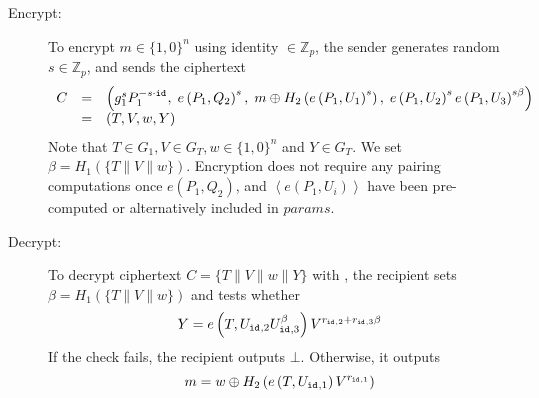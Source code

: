 \begin{algorithm}
\begin{description}
\item[Encrypt:] To encrypt $m \in \{ 1, 0 \}^n$ using identity \id{} $\in \mathbb{Z}_p$, the sender generates random $s \in \mathbb{Z}_p$, and sends the ciphertext
\begin{equation*}
 \begin{array}{lcl}
  C & = & \left( g_{1}^{s}P_1^{-s\cdot\mathtt{id}_{}}, \; e \left( P_1, Q_2\right)^s, \; m \oplus H_2 \left( e \left( P_1, U_1 \right)^s \right), \; e \left( P_1, U_2 \right)^s e \left( P_1, U_3\right)^{s \beta} \right) \\ & = & \left( T, V, w, Y \right)
 \end{array}
\end{equation*}
Note that $T \in G_1, V \in G_T,  w \in \{ 1, 0 \}^n$ and $Y \in G_T$. We set $\beta = H_1 \left( \{ T \parallel V \parallel w \} \right)$. Encryption does not require any pairing computations once $e \left( P_1, Q_2 \right)$, and $\left< e \left( P_1, U_i \right) \right>$ have been pre-computed or alternatively included in $params$.

\item[Decrypt:] To decrypt ciphertext $C = \{ T \parallel V \parallel w \parallel Y \}$ with \id{}, the recipient sets $\beta=H_1 \left( \{ T \parallel V \parallel w \} \right)$ and tests whether
\begin{equation*}
 Y = e \left( T, U_{\mathtt{id}_{}, 2}U_{\mathtt{id}_{}, 3}^{\beta} \right)V^{r_{\mathtt{id}_{},2}+r_{\mathtt{id}_{},3}\beta}
\end{equation*}
If the check fails, the recipient outputs $\bot$. Otherwise, it outputs
\begin{equation*}
 m = w \oplus H_2 \left( e \left( T, U_{\mathtt{id}_{}, 1} \right) V^{r_{\mathtt{id}_{}, 1}} \right)
\end{equation*}

\end{description}
\end{algorithm}

